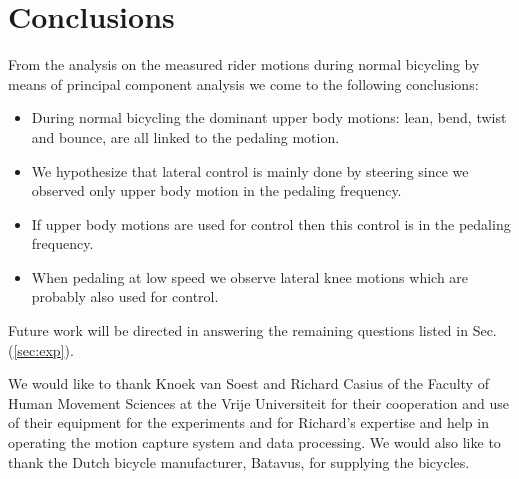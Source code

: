 \section{Conclusions}
\label{sec:conclusions}
From the analysis on the measured rider motions during normal bicycling by means of principal component analysis we come to the following conclusions:
\begin{itemize}
	\item During normal bicycling the dominant upper body motions:  lean, bend, twist and bounce, are all linked to the pedaling motion.
	\item We hypothesize that lateral control is mainly done by steering since we observed only upper body motion in the pedaling frequency.
	\item If upper body motions are used for control then this control is in the pedaling frequency.
	\item When pedaling at low speed we observe lateral knee motions which are probably also used for control.
\end{itemize}
Future work will be directed in answering the remaining questions listed in Sec. (\ref{sec:exp}).
\begin{acknowledgements}
We would like to thank Knoek van Soest and Richard Casius of the Faculty of Human Movement Sciences at the Vrije Universiteit for their cooperation and use of their equipment for the experiments and for Richard's expertise and help in operating the motion capture system and data processing. We would also like to thank the Dutch bicycle manufacturer, Batavus, for supplying the bicycles.
\end{acknowledgements}


